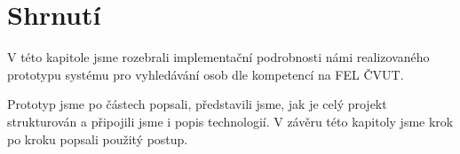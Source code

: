 \section{Shrnutí}
V této kapitole jsme rozebrali implementační podrobnosti námi realizovaného prototypu systému pro vyhledávání osob dle kompetencí na FEL ČVUT.\par
Prototyp jsme po částech popsali, představili jsme, jak je celý projekt strukturován a připojili jsme i popis technologií. V závěru této kapitoly jsme krok po kroku popsali použitý postup.





